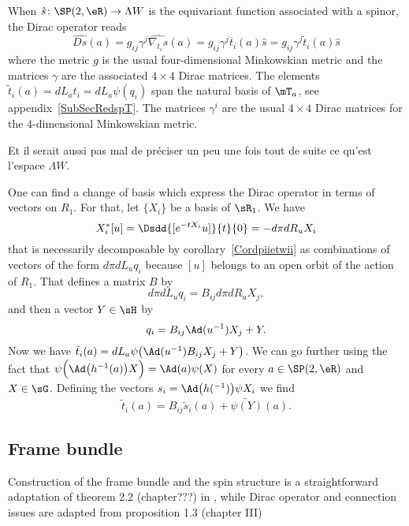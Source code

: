 When $\hat{s}\colon \SP(2,\eR) \to \Lambda W$ is the equivariant function associated with a spinor, the Dirac operator reads
\begin{equation}        \label{EqDiracAdsquatre}
\widehat{Ds}(a)=g_{ij}\gamma^j\widehat{\nabla_{t_i}s}(a)
        =g_{ij}\gamma^j\overline{ t }_i(a)\hat{s}
        =g_{ij}\gamma^j\tilde t_i(a)\hat{s}
\end{equation}
where the metric $g$ is the usual four-dimensional Minkowskian metric and the matrices $\gamma$ are the associated $4\times 4$ Dirac matrices. The elements $\tilde t_i(a)=dL_at_i=dL_a\psi(q_i)$ span the natural basis of $\mT_a$, see appendix~\ref{SubSecRedspT}. The matrices $\gamma^i$ are the usual $4\times 4$ Dirac matrices for the $4$-dimensional Minkowskian metric.

\begin{probleme}
Et il serait aussi pas mal de préciser un peu une fois tout de suite ce qu'est l'espace $\Lambda W$.
\end{probleme}

One can find a change of basis which express the Dirac operator in terms of vectors on $R_1$. For that, let $\{ X_i \}$ be a basis of $\sR_1$. We have
\[
  X^*_i[u]=\Dsdd{ [ e^{-tX_i}u] }{t}{0}=-d\pi dR_uX_i
\]
that is necessarily decomposable by corollary~\ref{Cordpiietwii} as combinations of vectors of the form $d\pi dL_uq_i$ because $[u]$ belongs to an open orbit of the action of $R_1$. That defines a matrix $B$ by
\[
  d\pi dL_uq_i=B_{ij}d\pi dR_uX_j,
\]
and then a vector $Y\in \sH$ by
\begin{equation}
q_i=B_{ij}\Ad(u^{-1})X_j+Y.
\end{equation}
Now we have $\tilde t_i(a)=dL_a\psi\big( \Ad(u^{-1})B_{ij}X_j+Y \big)$. We can go further using the fact that $\psi\Big( \Ad\big( h^{-1}(a) \big)X \Big)=\Ad(a)\psi(X)$ for every $a\in\SP(2,\eR)$ and $X\in\sG$. Defining the vectors $s_i=\Ad\big( h(^{-1}) \big)\psi X_i$ we find
\begin{equation}
\tilde t_i(a)=B_{ij}\tilde s_i(a)+\widetilde{\psi(Y)}(a).
\end{equation}

\subsection{Frame bundle}

Construction of the frame bundle and the spin structure is a straightforward adaptation of theorem 2.2 (chapter???) in \cite{AnnikFranc}, while Dirac operator and connection issues are adapted from proposition 1.3 (chapter III)

